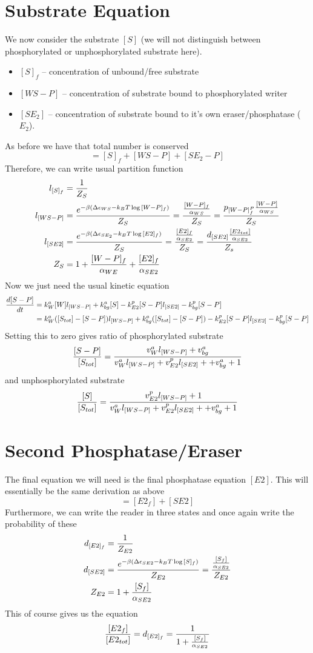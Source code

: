 \documentclass[preprint,onecolumn,amsmath]{revtex4-1}
\def\be{\begin{equation}}
\def\ee{\end{equation}}
\begin{document}
\section{Substrate Equation}
We now consider the substrate $[S]$ (we will not distinguish between phosphorylated or unphosphorylated substrate here). 
\begin{itemize}
\item $[S]_f$ -- concentration of unbound/free substrate 
\item $[WS-P]$ -- concentration of  substrate bound to phosphorylated writer
\item $[SE_2]$ -- concentration of substrate bound to it's own eraser/phosphatase ($E_2$).
\end{itemize}
As before we have that total number is conserved
\be
[S_{tot}]= [S]_f+[WS-P]+[SE_2-P]
\ee
Therefore, we can write usual partition function
\begin{align}
l_{[S]_f} &= {1 \over Z_{S}} \\
l_{[WS-P]} &= {e^{-\beta (\Delta \epsilon_{WS} -k_B T \log{[W-P]_f})}  \over Z_{S}} ={ {[W-P]_f \over \alpha_{WS}} \over Z_S}=
{ p_{[W-P]_f^P} {[W-P] \over \alpha_{WS}} \over Z_S} \\
l_{[SE2]} &= {e^{-\beta (\Delta \epsilon_{SE_2} -k_B T \log{[E2]_f})}  \over Z_{S}} ={ {[E2]_f \over \alpha_{SE2}} \over Z_S} 
={d_{[SE2]}{ [E2_{tot}] \over \alpha_{SE2}} \over Z_s} \\
 Z_S&= 1+  {[W-P]_f \over \alpha_{WE}}+ {[E2]_f \over \alpha_{SE2}}
 \end{align} 
Now we just need the usual kinetic equation
\begin{align}
{d [S-P] \over dt} &= k_W^a [W] l_{[WS-P]}  + k_{bg}^a [S] - k_{E2}^p [S-P]l_{[SE2]} - k_{bg}^p [S-P] \\
&= k_W^a ([S_{tot}] - [S-P] )l_{[WS-P]}  + k_{bg}^a ([S_{tot}] -[S-P]) - k_{E2}^p [S-P]l_{[SE2]}- k_{bg}^p [S-P] 
\end{align}
Setting this to zero gives ratio of phosphorylated substrate
\be
{[S-P] \over [S_{tot}]} ={ v_W^a l_{[WS-P]} +v_{bg}^a  \over v_W^a l_{[WS-P]}  + v_{E2}^p l_{[SE2]} + +v_{bg}^a+1}
\ee
and unphosphorylated substrate
\be
{[S] \over [S_{tot}]} ={ v_{E2}^p l_{[WS-P]} +1 \over v_W^a l_{[WS-P]}  + v_{E2}^p l_{[SE2]} + +v_{bg}^a+1}
\ee

\section{Second Phosphatase/Eraser}
The final equation we will need is the final phosphatase equation $[E2]$. This will essentially be the same derivation as above
\be
[E2_{tot}]= [E2_f]+[SE2]
\ee
Furthermore, we can write the reader in three states and once again write the probability of these
\begin{align}
d_{[E2]_f} &= {1 \over Z_{E2}} \\
d_{[SE2]} &= {e^{-\beta (\Delta \epsilon_{SE2} -k_B T \log{[S]_f})}  \over Z_{E2}}= {{[S_f] \over \alpha_{SE2}} \over Z_{E2}} \\
Z_{E2}  &= 1+{[S_f] \over \alpha_{SE2}}
\end{align} 
This of course gives us the equation
\be
{ [E2_f] \over [E2_{tot}]} = d_{[E2]_f} = {1 \over 1+{[S_f] \over \alpha_{SE2}}}
\ee
\end{document}
